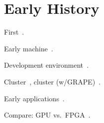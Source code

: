 \section{Early History}
\label{sec:history}

First~\cite{khdo06}.

Early machine~\cite{kdh+06}.

Development environment~\cite{cft+10}.

Cluster~\cite{tl10}, cluster (w/GRAPE)~\cite{sbm+09}.

Early applications~\cite{bkdb10,khdo06,shsc08,tl10}.

Compare: GPU vs.~FPGA~\cite{bnw+10,cls+08,cz09,jpbc10,sww+10,tb10}.
